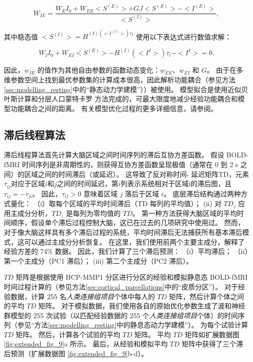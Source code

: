 \documentclass[lang=cn,a4paper,newtx]{elegantpaper}
\begin{document}
\begin{equation}\label{eq:analytic_expression}
	W_{IE} = 
		\frac{
			W_E I_0 + W_{EE} <S^{(E)}> + GJ <S^{(E)}> - <I^{(E)}>
			}
			{
				<S^{(I)}>
			},
\end{equation}

其中稳态值 $ <S^{(I)}> = H^{(I) (<I^{(I)}>) \tau_I } $ 使用以下表达式进行数值求解：

\begin{equation}\label{eq:solved_expression}
	W_I I_0 
	+ W_{EI}<S^{(E)}> 
	- H^{(I)} (<I^{I}>) \tau_l
	- <I^{I}>
	= 0.
\end{equation}

因此，$ w_{IE} $ 的值作为其他自由参数的函数动态变化：$ w_{EE} $、$ w_{EI} $ 和 $ G $。
由于在多维参数空间上找到最优参数集的计算成本很高，因此解析功能耦合（参见方法\ref{sec:modelling_resting}中的“静态动力学建模”））被使用。
模型拟合是使用近似贝叶斯计算和分层人口蒙特卡罗 \cite{arnatkeviciute2021genetic,pang2022evolutionary} 方法完成的，可最大限度地减少经验功能耦合和模型功能耦合之间的距离。
有关模型优化过程的更多详细信息，请参阅\cite{rosen2022estimation}。


\subsection{滞后线程算法} \label{sec:lag_threads}

滞后线程算法首先计算大脑区域之间时间序列的滞后互协方差函数。
假设 BOLD-fMRI 时间序列是非周期性的\cite{aquino2020identifying}，则获得互协方差函数呈现极值（通常在 0 到 2 s 之间）的区域之间的时间滞后（或延迟）\cite{gajwani2022can}。
这导致了反对称时间- 延迟矩阵TD，元素$ \tau_{ij} $对应于区域$ i $和$ j $之间的时间延迟，第$ i $列表示系统相对于区域i的滞后图，且$ \tau_{ij}=- \tau_{ji} $。
因此，$ \tau_{ij}>0 $ 意味着区域 $ j $ 落后于区域 $ i $。
底层滞后结构通过两种方式量化：
（i）取每个区域的平均时间滞后（TD 每列的平均值）； 
(ii) 对 $ TD_z $ 应用主成分分析，$ TD_z $ 是每列为零均值的 $ TD $。
第一种方法获得大脑区域的平均时间顺序，假设单个滞后过程控制大脑，这已在过去的几项研究中使用过\cite{gajwani2022can,hamid2021wave,yousefi2021propagating}。
然而，对于像大脑这样具有多个滞后过程的系统，平均时间滞后无法捕获所有基本滞后模式，这可以通过主成分分析\cite{coalson2018impact}恢复。
在这里，我们使用前两个主要主成分，解释了经验方差的 74\% 数据。
因此，我们计算了三个滞后预测：
（i）平均滞后； 
（ii）第一个主成分（PC1 滞后）； (iii) 第二个主成分（PC2 滞后）。


$ TD $ 矩阵是根据使用 HCP-MMP1 分区进行分区的经验和模拟静息态 BOLD-fMRI 时间过程计算的（参见方法\ref{sec:cortical_parcellations}中的“皮质分区”）。
对于经验数据，计算 255 名\textit{人类连接组项目}个体中每人的 $ TD $ 矩阵，然后计算个体之间的平均 $ TD $ 矩阵。
对于模拟数据，我们使用各自的原始优化参数生成了波和神经群模型的 255 次试验（以匹配经验数据的 255 个\textit{人类连接组项目}个体）的时间序列（参见“方法\ref{sec:modelling_resting}中的静息态动力学建模”）。
为每个试验计算 $ TD $ 矩阵。
然后，计算各个试验的平均 $ TD $ 矩阵。
平均 $ TD $ 矩阵如扩展数据图 \ref{fig:extended_fig_9}a 所示。
最后，从经验和模拟平均 $ TD $ 矩阵中获得了三个滞后预测（扩展数据图 \ref{fig:extended_fig_9}b-d）。
\end{document}
